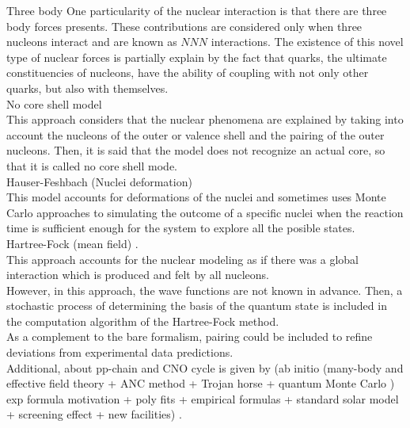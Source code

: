\documentclass[openany]{book}
\begin{document}
Three body \cite{grigorenko_danilin_efros_shulgina_zhukov_1998}
One particularity of the nuclear interaction is that there are three body forces presents. These contributions are considered only when three nucleons interact and are known as $NNN$ interactions. The existence of this novel type of nuclear forces is partially explain by the fact that quarks, the ultimate constituencies of nucleons, have the ability of coupling with not only other quarks, but also with themselves. \\

No core shell model \cite{dohet-eraly_navratil_quaglioni_horiuchi_hupin_raimondi_2016} \\

This approach considers that the nuclear phenomena are explained by taking into account the nucleons of the outer or valence shell and the pairing of the outer nucleons. Then, it is said that the model does not recognize an actual core, so that it is called no core shell mode. \\

Hauser-Feshbach (Nuclei deformation) \cite{jayatissa_avila_rehm_talwar_mohr_auranen_chen_gorelov_hoffman_jiang_et_2022} \\

This model accounts for deformations of the nuclei and sometimes uses Monte Carlo approaches to simulating the outcome of a specific nuclei when the reaction time is sufficient enough for the system to explore all the posible states. \\

Hartree-Fock (mean field) \cite{leanh_minhloc_2022}. \\ 

This approach accounts for the nuclear modeling as if there was a global interaction which is produced and felt by all nucleons. \\

However, in this approach, the wave functions are not known in advance. Then, a stochastic process of determining the basis of the quantum state is included in the computation algorithm of the Hartree-Fock method. \\

As a complement to the bare formalism, pairing could be included to refine deviations from experimental data predictions. \\

Additional, about pp-chain and CNO cycle  is given by (ab initio (many-body and effective field theory + ANC method + Trojan horse + quantum Monte Carlo ) exp formula motivation + poly fits + empirical formulas +   standard solar model + screening effect + new facilities) \cite{adelberger_garcia_robertson_snover_balantekin_heeger_ramsey-musolf_bemmerer_junghans_bertulani_et_2011}.
\end{document}
